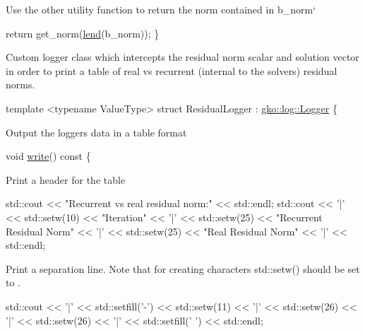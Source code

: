 Use the other utility function to return the norm contained in {\ttfamily b\+\_\+norm}`


\begin{DoxyCode}
    \textcolor{keywordflow}{return} get\_norm(\hyperlink{namespacegko_aa8cb4876b72e5e1036ea9575443c439b}{lend}(b\_norm));
\}
\end{DoxyCode}


Custom logger class which intercepts the residual norm scalar and solution vector in order to print a table of real vs recurrent (internal to the solvers) residual norms.


\begin{DoxyCode}
\textcolor{keyword}{template} <\textcolor{keyword}{typename} ValueType>
\textcolor{keyword}{struct }ResidualLogger : \hyperlink{classgko_1_1log_1_1Logger}{gko::log::Logger} \{
\end{DoxyCode}


Output the logger\textquotesingle{}s data in a table format


\begin{DoxyCode}
\textcolor{keywordtype}{void} \hyperlink{namespacegko_a859dc47a462721d83728d91ab7fa2148}{write}()\textcolor{keyword}{ const}
\textcolor{keyword}{}\{
\end{DoxyCode}


Print a header for the table


\begin{DoxyCode}
std::cout << \textcolor{stringliteral}{"Recurrent vs real residual norm:"} << std::endl;
std::cout << \textcolor{charliteral}{'|'} << std::setw(10) << \textcolor{stringliteral}{"Iteration"} << \textcolor{charliteral}{'|'} << std::setw(25)
          << \textcolor{stringliteral}{"Recurrent Residual Norm"} << \textcolor{charliteral}{'|'} << std::setw(25)
          << \textcolor{stringliteral}{"Real Residual Norm"} << \textcolor{charliteral}{'|'} << std::endl;
\end{DoxyCode}


Print a separation line. Note that for creating {} characters {\ttfamily std\+::setw()} should be set to {}.


\begin{DoxyCode}
std::cout << \textcolor{charliteral}{'|'} << std::setfill(\textcolor{charliteral}{'-'}) << std::setw(11) << \textcolor{charliteral}{'|'}
          << std::setw(26) << \textcolor{charliteral}{'|'} << std::setw(26) << \textcolor{charliteral}{'|'}
          << std::setfill(\textcolor{charliteral}{' '}) << std::endl;
\end{DoxyCode}


